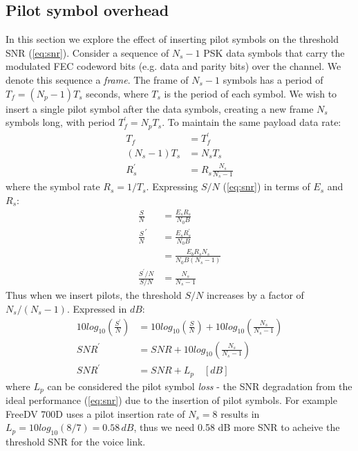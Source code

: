 \documentclass{article}
\begin{document}
\subsection{Pilot symbol overhead}

In this section we explore the effect of inserting pilot symbols on the threshold SNR (\ref{eq:snr}). Consider a sequence of $N_s-1$ PSK data symbols that carry the modulated FEC codeword bits (e.g. data and parity bits) over the channel. We denote this sequence a \emph{frame}. The frame of $N_s-1$ symbols has a period of $T_f=(N_p-1)T_s$ seconds, where $T_s$ is the period of each symbol.  We wish to insert a single pilot symbol after the data symbols, creating a new frame $N_s$ symbols long, with period $T^\prime_f=N_pT_s$.  To maintain the same payload data rate:
\begin{equation}
\begin{split}
T_f &= T^\prime_f \\
(N_s-1)T_s &= N_sT_s \\
R^\prime_s &= R_s\frac{N_s}{N_s-1}
\end{split}
\end{equation}
where the symbol rate $R_s=1/T_s$.  Expressing $S/N$ (\ref{eq:snr}) in terms of $E_s$ and $R_s$:
\begin{equation}
\label{eq_snr_s}
\begin{split}
\frac{S}{N} &= \frac{E_sR_s}{N_0B} \\
\frac{S}{N}^\prime &= \frac{E_sR^\prime_s}{N_0B} \\
                   &= \frac{E_bR_sN_s}{N_0B(N_s-1)} \\
\frac{S^\prime/N}{S/N} &= \frac{N_s}{N_s-1}
\end{split}
\end{equation}
Thus when we insert pilots, the threshold $S/N$ increases by a factor of $N_s/(N_s-1)$. Expressed in $\si{dB}$:
\begin{equation}
\begin{split}
10log_{10}\left(\frac{S^\prime}{N}\right) &= 10log_{10}\left(\frac{S}{N}\right) + 10log_{10}\left(\frac{N_s}{N_s-1}\right) \\
SNR^\prime &= SNR + 10log_{10}\left(\frac{N_s}{N_s-1}\right) \\
SNR^\prime &= SNR + L_p  \quad [\si{dB}]
\end{split}
\end{equation}
where $L_p$ can be considered the pilot symbol \emph{loss} - the SNR degradation from the ideal performance (\ref{eq:snr}) due to the insertion of pilot symbols. For example FreeDV 700D uses a pilot insertion rate of $N_s=8$ results in $L_p=10log_{10}(8/7)=0.58 \, \si{dB}$, thus we need 0.58 dB more SNR to acheive the threshold SNR for the voice link.
\end{document}
